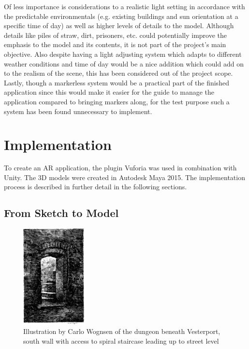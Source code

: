 Of less importance is considerations to a realistic light setting in accordance with the predictable environmentals (e.g. existing buildings and sun orientation at a specific time of day) as well as higher levels of details to the model. Although details like piles of straw, dirt, prisoners, etc. could potentially improve the emphasis to the model and its contents, it is not part of the project’s main objective. Also despite having a light adjusting system which adapts to different weather conditions and time of day would be a nice addition which could add on to the realism of the scene, this has been considered out of the project scope. Lastly, though a markerless system would be a practical part of the finished application since this would make it easier for the guide to manage the application compared to bringing markers along, for the test purpose such a system has been found unnecessary to implement.


\section{Implementation}
To create an AR application, the plugin Vuforia was used in combination with Unity. The 3D models were created in Autodesk Maya 2015. The implementation process is described in further detail in the following sections.

\subsection{From Sketch to Model}
\begin{figure}
\centering
        \includegraphics[width=0.3\textwidth]{figures/sketch1.png}
        \caption{Illustration by Carlo Wognsen of the dungeon beneath Vesterport, south wall with access to spiral staircase leading up to street level \cite{Riismoller1961}}\label{fig:sketch1}
\end{figure}

